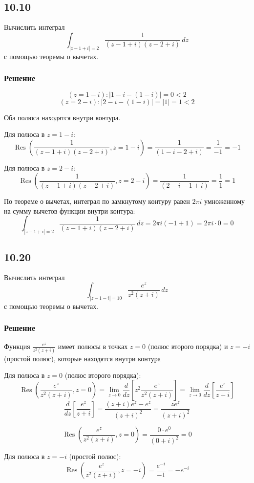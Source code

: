 \documentclass[12pt,a4paper]{article}
\begin{document}
\subsection*{10.10}
Вычислить интеграл
\[
\int_{|z - 1 + i| = 2}^{} \frac{1}{(z - 1 + i)(z - 2 + i)} \, dz
\]
с помощью теоремы о вычетах.
\subsubsection*{Решение}
\[ 
(z = 1 - i): |1 - i - (1 - i)| = 0 < 2
\]
\[
 (z = 2 - i): |2 - i - (1 - i)| = |1| = 1 < 2
\]

Оба полюса находятся внутри контура.

Для полюса в \(z = 1 - i\):
\[
\operatorname{Res}\left( \frac{1}{(z - 1 + i)(z - 2 + i)}, z = 1 - i \right) = \frac{1}{(1 - i - 2 + i)} = \frac{1}{-1} = -1
\]

Для полюса в \(z = 2 - i\):
\[
\operatorname{Res}\left( \frac{1}{(z - 1 + i)(z - 2 + i)}, z = 2 - i \right) = \frac{1}{(2 - i - 1 + i)} = \frac{1}{1} = 1
\]

По теореме о вычетах, интеграл по замкнутому контуру равен \(2\pi i\) умноженному на сумму вычетов функции внутри контура:
\[
\int_{|z - 1 + i| = 2} \frac{1}{(z - 1 + i)(z - 2 + i)} \, dz = 2\pi i \left( -1 + 1 \right) = 2\pi i \cdot 0 = 0
\]
\subsection*{10.20}
Вычислить интеграл
\[
\int_{|z - 1 - i| = 10} \frac{e^z}{z^2(z + i)} \, dz
\]
с помощью теоремы о вычетах.
\subsubsection*{Решение}
Функция \( \frac{e^z}{z^2(z + i)} \) имеет полюсы в точках \( z = 0 \) (полюс второго порядка) и \( z = -i \) (простой полюс), которые находятся внутри контура

Для полюса в \(z = 0\) (полюс второго порядка):
\[
\operatorname{Res}\left( \frac{e^z}{z^2(z + i)}, z = 0 \right) = \lim_{z \to 0} \frac{d}{dz} \left[ z^2 \frac{e^z}{z^2(z + i)} \right] = \lim_{z \to 0} \frac{d}{dz} \left[ \frac{e^z}{z + i} \right]
\]
\[
\frac{d}{dz} \left[ \frac{e^z}{z + i} \right] = \frac{(z + i) e^z - e^z}{(z + i)^2} = \frac{z e^z}{(z + i)^2}
\]

\[
\operatorname{Res}\left( \frac{e^z}{z^2(z + i)}, z = 0 \right) = \frac{0 \cdot e^0}{(0 + i)^2} = 0
\]

Для полюса в \(z = -i\) (простой полюс):
\[
\operatorname{Res}\left( \frac{e^z}{z^2(z + i)}, z = -i \right) = \frac{e^{-i}}{-1} = -e^{-i}
\]
\end{document}
